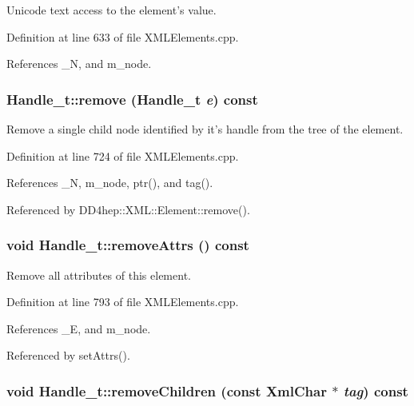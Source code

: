 Unicode text access to the element's value. 

Definition at line 633 of file XMLElements.cpp.

References \_\-N, and m\_\-node.\hypertarget{class_d_d4hep_1_1_x_m_l_1_1_handle__t_a2e4294b309fc5a0f6f292f17303585e9}{
\subsubsection[{remove}]{ Handle\_\-t::remove ({\bf Handle\_\-t} {\em e}) const}}
\label{class_d_d4hep_1_1_x_m_l_1_1_handle__t_a2e4294b309fc5a0f6f292f17303585e9}


Remove a single child node identified by it's handle from the tree of the element. 

Definition at line 724 of file XMLElements.cpp.

References \_\-N, m\_\-node, ptr(), and tag().

Referenced by DD4hep::XML::Element::remove().\hypertarget{class_d_d4hep_1_1_x_m_l_1_1_handle__t_aba8a10226d5bea74d81f2eca83d0cc2c}{
\subsubsection[{removeAttrs}]{\setlength{\rightskip}{0pt plus 5cm}void Handle\_\-t::removeAttrs () const}}
\label{class_d_d4hep_1_1_x_m_l_1_1_handle__t_aba8a10226d5bea74d81f2eca83d0cc2c}


Remove all attributes of this element. 

Definition at line 793 of file XMLElements.cpp.

References \_\-E, and m\_\-node.

Referenced by setAttrs().\hypertarget{class_d_d4hep_1_1_x_m_l_1_1_handle__t_a36ab396dc039bfd2c9c9b11765b98f5c}{
\subsubsection[{removeChildren}]{\setlength{\rightskip}{0pt plus 5cm}void Handle\_\-t::removeChildren (const {\bf XmlChar} $\ast$ {\em tag}) const}}
\label{class_d_d4hep_1_1_x_m_l_1_1_handle__t_a36ab396dc039bfd2c9c9b11765b98f5c}


